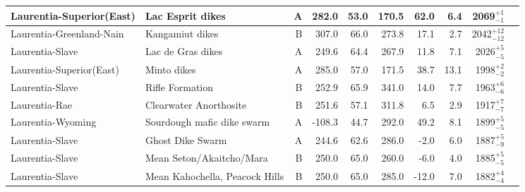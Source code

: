 \begin{longtable}{p{1 in}p{1 in}rrrrrrrp{1.5 in}}
      Laurentia-Superior(East) &                                 Lac Esprit dikes &      A &     282.0 &      53.0 & 170.5 &  62.0 &       6.4 &     2069$^{+1}_{-1}$ &                                  \cite{Evans2010a} \\ \hline
      Laurentia-Greenland-Nain &                                  Kangamiut dikes &      B &     307.0 &      66.0 & 273.8 &  17.1 &       2.7 &   2042$^{+12}_{-12}$ &                                 \cite{Fahrig1976b} \\ \hline
               Laurentia-Slave &                                Lac de Gras dikes &      A &     249.6 &      64.4 & 267.9 &  11.8 &       7.1 &     2026$^{+5}_{-5}$ &                                 \cite{Buchan2009a} \\ \hline
      Laurentia-Superior(East) &                                      Minto dikes &      A &     285.0 &      57.0 & 171.5 &  38.7 &      13.1 &     1998$^{+2}_{-2}$ &                                  \cite{Evans2010a} \\ \hline
               Laurentia-Slave &                                  Rifle Formation &      B &     252.9 &      65.9 & 341.0 &  14.0 &       7.7 &     1963$^{+6}_{-6}$ &                                  \cite{Evans1981a} \\ \hline
                 Laurentia-Rae &                           Clearwater Anorthosite &      B &     251.6 &      57.1 & 311.8 &   6.5 &       2.9 &     1917$^{+7}_{-7}$ &                                  \cite{Halls1999a} \\ \hline
             Laurentia-Wyoming &                       Sourdough mafic dike swarm &      A &    -108.3 &      44.7 & 292.0 &  49.2 &       8.1 &     1899$^{+5}_{-5}$ &                                 \cite{Kilian2016b} \\ \hline
               Laurentia-Slave &                                 Ghost Dike Swarm &      A &     244.6 &      62.6 & 286.0 &  -2.0 &       6.0 &     1887$^{+5}_{-9}$ &                                 \cite{Buchan2016a} \\ \hline
               Laurentia-Slave &                         Mean Seton/Akaitcho/Mara &      B &     250.0 &      65.0 & 260.0 &  -6.0 &       4.0 &     1885$^{+5}_{-5}$ &                               \cite{Mitchell2010c} \\ \hline
               Laurentia-Slave &                   Mean Kahochella, Peacock Hills &      B &     250.0 &      65.0 & 285.0 & -12.0 &       7.0 &     1882$^{+4}_{-4}$ &                               \cite{Mitchell2010c} \\ \hline

\end{longtable}
